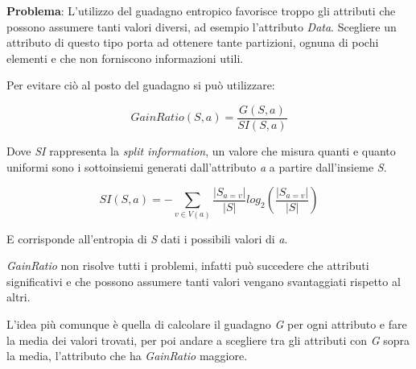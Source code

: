 \textbf{Problema}: L'utilizzo del guadagno entropico favorisce troppo
gli attributi che possono assumere tanti valori diversi, ad esempio
l'attributo \emph{Data}. 
Scegliere un attributo di questo tipo porta ad ottenere tante partizioni, ognuna di pochi
elementi e che non forniscono informazioni utili.

Per evitare ciò al posto del guadagno si può utilizzare:

$$
GainRatio(S, a) = \frac{G(S, a)}{SI(S,a)}
$$

Dove \emph{SI} rappresenta la \emph{split information}, un valore che
misura quanti e quanto uniformi sono i sottoinsiemi generati
dall'attributo \emph{a} a partire dall'insieme \emph{S}.

$$
SI(S,a) = - \sum_{v \in V(a)}\frac{|S_{a = v}|}{|S|} log_2(\frac{|S_{a = v}|}{|S|})
$$

E corrisponde all'entropia di \emph{S} dati i possibili valori di
\emph{a}.

\emph{GainRatio} non risolve tutti i problemi, infatti può succedere che
attributi significativi e che possono assumere tanti valori vengano
svantaggiati rispetto al altri.

L'idea più comunque è quella di calcolare il guadagno \emph{G} per ogni
attributo e fare la media dei valori trovati, per poi andare a
scegliere tra gli attributi con \emph{G} sopra la media,
l'attributo che ha \emph{GainRatio} maggiore.
